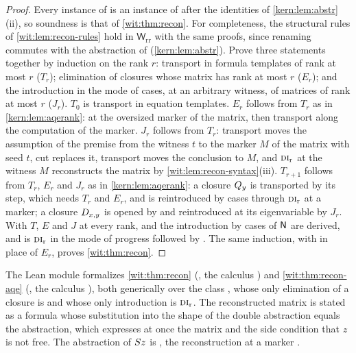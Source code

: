 \begin{proof}
Every instance of  is an instance of  after the
identities of \cref{kern:lem:abstr}(ii), so soundness is that of
\cref{wit:thm:recon}.  For completeness, the structural rules of
\cref{wit:lem:recon-rules} hold in $\mathsf{W}_{\mathrm{rr}}$ with the same
proofs, since renaming commutes with the abstraction of 
(\cref{kern:lem:abstr}).  Prove three statements together by induction on
the rank $r$: transport in formula templates of rank at most $r$
($T_r$); elimination of closures whose matrix has rank at most $r$
($E_r$); and the introduction in the mode of cases, at an arbitrary witness,
of matrices of rank at most $r$ ($J_r$).  $T_0$ is transport in equation
templates.  $E_r$ follows from $T_r$ as in \cref{kern:lem:aqerank}:
 at the oversized marker of the matrix, then transport along
the computation of the marker.  $J_r$ follows from $T_r$: transport moves
the assumption of the premise from the witness $t$ to the marker $M$ of the
matrix with seed $t$, cut replaces it, transport moves the conclusion to $M$,
and $\rulename{DI}_{\mathrm r}$ at the witness $M$ reconstructs the matrix by
\cref{wit:lem:recon-syntax}(iii).  $T_{r+1}$ follows from $T_r$, $E_r$ and
$J_r$ as in \cref{kern:lem:aqerank}: a closure $Q_{y}$ is transported by its
step, which needs $T_r$ and $E_r$, and is reintroduced by cases through
$\rulename{DI}_{\mathrm r}$ at a marker; a closure $D_{x,y}$ is opened by
 and reintroduced at its eigenvariable by $J_r$.  With
$T$, $E$ and $J$ at every rank,  and the introduction by cases
of $\mathsf{N}$ are derived, and  is $\rulename{DI}_{\mathrm r}$ in the
mode of progress followed by .  The same induction, with
 in place of $E_r$, proves \cref{wit:thm:recon}.
\end{proof}

The Lean module  formalizes \cref{wit:thm:recon}
(, the calculus ) and
\cref{wit:thm:recon-aqe} (, the calculus
), both generically over the class , whose only
elimination of a closure is  and whose only introduction is
$\rulename{DI}_{\mathrm r}$.  The reconstructed matrix is stated as a formula
whose substitution into the shape of the double abstraction equals the
abstraction, which expresses at once the matrix and the side condition that
$z$ is not free.  The abstraction of $S z$ is
, the reconstruction at a marker
.

